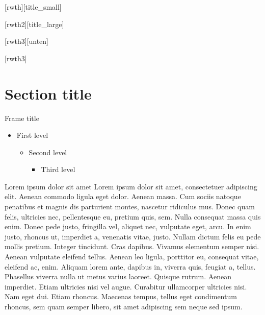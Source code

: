 [rwth][title_small]{}
\begin{frame}[plain]
\titlepage
\end{frame}

[rwth2][title_large]{}
\begin{frame}[plain]
\titlepage
\end{frame}

[rwth3][unten]{}
\begin{frame}[plain]
\titlepage
\end{frame}

[rwth3]{}
\begin{frame}[plain]
\titlepage
\end{frame}


\section{Section title}

\begin{frame}{Frame title}
  \begin{itemize}
    \item First level
    \begin{itemize}
      \item Second level
      \begin{itemize}
      \item Third level
    \end{itemize}
  \end{itemize}
\end{itemize}
\end{frame}

\begin{frame}{Lorem ipsum dolor sit amet}
Lorem ipsum dolor sit amet, consectetuer adipiscing elit. Aenean commodo ligula eget dolor. Aenean massa. Cum sociis natoque penatibus et magnis dis parturient montes, nascetur ridiculus mus. Donec quam felis, ultricies nec, pellentesque eu, pretium quis, sem. Nulla consequat massa quis enim. Donec pede justo, fringilla vel, aliquet nec, vulputate eget, arcu. In enim justo, rhoncus ut, imperdiet a, venenatis vitae, justo. Nullam dictum felis eu pede mollis pretium. Integer tincidunt. Cras dapibus. Vivamus elementum semper nisi. Aenean vulputate eleifend tellus. Aenean leo ligula, porttitor eu, consequat vitae, eleifend ac, enim. Aliquam lorem ante, dapibus in, viverra quis, feugiat a, tellus. Phasellus viverra nulla ut metus varius laoreet. Quisque rutrum. Aenean imperdiet. Etiam ultricies nisi vel augue. Curabitur ullamcorper ultricies nisi. Nam eget dui. Etiam rhoncus. Maecenas tempus, tellus eget condimentum rhoncus, sem quam semper libero, sit amet adipiscing sem neque sed ipsum.
\end{frame}

